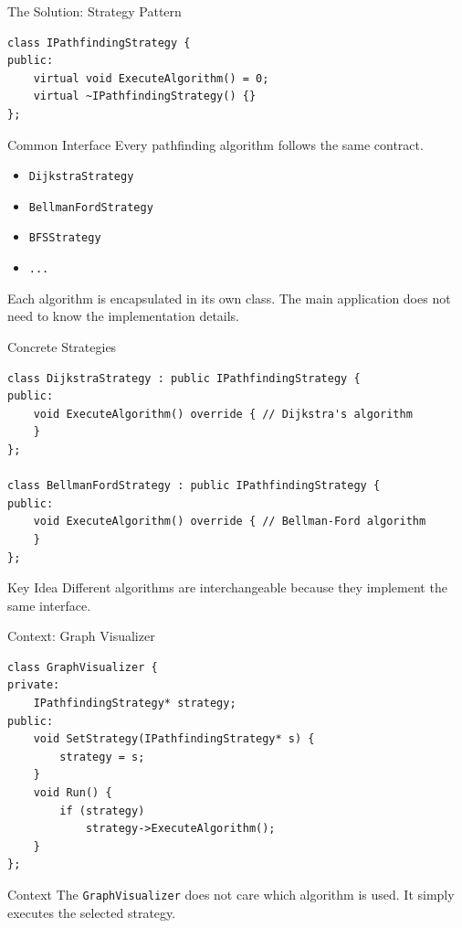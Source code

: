 \documentclass[aspectratio=169]{beamer}
\begin{document}
\begin{frame}[fragile]{The Solution: Strategy Pattern}

\begin{lstlisting}
class IPathfindingStrategy {
public:
    virtual void ExecuteAlgorithm() = 0;
    virtual ~IPathfindingStrategy() {}
};
\end{lstlisting}

\begin{block}{Common Interface}
    Every pathfinding algorithm follows the same contract.
\end{block}

\begin{itemize}
    \item \texttt{DijkstraStrategy}
    \item \texttt{BellmanFordStrategy}
    \item \texttt{BFSStrategy}
    \item \texttt{...}
\end{itemize}

Each algorithm is encapsulated in its own class.
The main application does not need to know the implementation details.
\end{frame}

\begin{frame}[fragile]{Concrete Strategies}

\begin{lstlisting}
class DijkstraStrategy : public IPathfindingStrategy {
public:
    void ExecuteAlgorithm() override { // Dijkstra's algorithm
    }
};

class BellmanFordStrategy : public IPathfindingStrategy {
public:
    void ExecuteAlgorithm() override { // Bellman-Ford algorithm
    }
};
\end{lstlisting}

\begin{block}{Key Idea}
    Different algorithms are interchangeable because
    they implement the same interface.
\end{block}

\end{frame}

\begin{frame}[fragile]{Context: Graph Visualizer}

\begin{lstlisting}
class GraphVisualizer {
private:
    IPathfindingStrategy* strategy;
public:
    void SetStrategy(IPathfindingStrategy* s) {
        strategy = s;
    }
    void Run() {
        if (strategy)
            strategy->ExecuteAlgorithm();
    }
};
\end{lstlisting}

\begin{block}{Context}
    The \texttt{GraphVisualizer} does not care which algorithm is used.
    It simply executes the selected strategy.
\end{block}

\end{frame}
\end{document}
